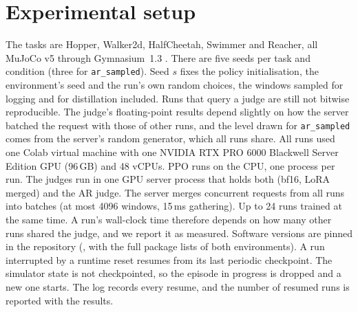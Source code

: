 \section{Experimental setup}\label{sec:setup}

The tasks are Hopper, Walker2d, HalfCheetah, Swimmer and Reacher, all MuJoCo v5 through Gymnasium~1.3
\cite{todorov2012mujoco,towers2024gymnasium}. There are five seeds per task and condition (three for
\texttt{ar\_sampled}). Seed $s$ fixes the policy initialisation, the environment's seed and the run's own random choices, the
windows sampled for logging and for distillation included. Runs that query a judge are still not bitwise reproducible.
The judge's floating-point results depend slightly on how the server batched the request with those of other runs, and
the level drawn for \texttt{ar\_sampled} comes from the server's random generator, which all runs share. All runs used one Colab virtual machine with one
NVIDIA RTX PRO 6000 Blackwell Server Edition GPU (96\,GB) and 48 vCPUs. PPO runs on the CPU, one process per run. The
judges run in one GPU server process that holds both \kev{} (bf16, LoRA merged) and the AR judge. The server merges
concurrent requests from all runs into batches (at most 4096 windows, 15\,ms gathering). Up to 24 runs trained at the
same time. A run's wall-clock time therefore depends on how many other runs shared the judge, and we report it as
measured. Software versions are pinned in the repository (, with the full package lists of
both environments). A run interrupted by a runtime reset resumes from its last periodic checkpoint. The simulator state is not
checkpointed, so the episode in progress is dropped and a new one starts. The log records every resume, and the number
of resumed runs is reported with the results.
